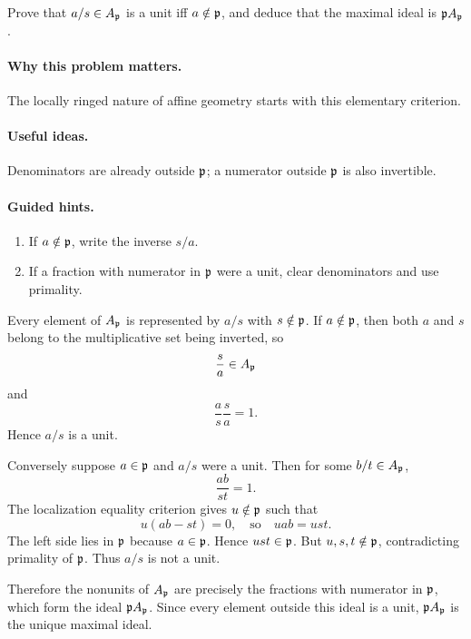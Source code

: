 \begin{problem}\label{prob:vi17-p14}
Prove that $a/s\in A_{\mathfrak p}$ is a unit iff $a\notin\mathfrak p$, and deduce that the maximal ideal is $\mathfrak p A_{\mathfrak p}$.
\end{problem}

\ifdefined\FullProblemDossiers
\paragraph{Why this problem matters.}
The locally ringed nature of affine geometry starts with this elementary criterion.

\paragraph{Useful ideas.}
Denominators are already outside $\mathfrak p$; a numerator outside $\mathfrak p$ is also invertible.

\paragraph{Guided hints.}
\begin{enumerate}
\item If $a\notin\mathfrak p$, write the inverse $s/a$.
\item If a fraction with numerator in $\mathfrak p$ were a unit, clear denominators and use primality.
\end{enumerate}

\begin{solution}
Every element of $A_{\mathfrak p}$ is represented by $a/s$ with $s\notin\mathfrak p$.
If $a\notin\mathfrak p$, then both $a$ and $s$ belong to the multiplicative set being inverted, so
\[
\frac{s}{a}\in A_{\mathfrak p}
\]
and
\[
\frac as\frac sa=1.
\]
Hence $a/s$ is a unit.

Conversely suppose $a\in\mathfrak p$ and $a/s$ were a unit.  Then for some $b/t\in A_{\mathfrak p}$,
\[
\frac{ab}{st}=1.
\]
The localization equality criterion gives $u\notin\mathfrak p$ such that
\[
u(ab-st)=0,
\quad\text{so}\quad
uab=ust.
\]
The left side lies in $\mathfrak p$ because $a\in\mathfrak p$.  Hence $ust\in\mathfrak p$.  But $u,s,t\notin\mathfrak p$, contradicting primality of $\mathfrak p$.  Thus $a/s$ is not a unit.

Therefore the nonunits of $A_{\mathfrak p}$ are precisely the fractions with numerator in $\mathfrak p$, which form the ideal $\mathfrak p A_{\mathfrak p}$.  Since every element outside this ideal is a unit, $\mathfrak p A_{\mathfrak p}$ is the unique maximal ideal.
\end{solution}



